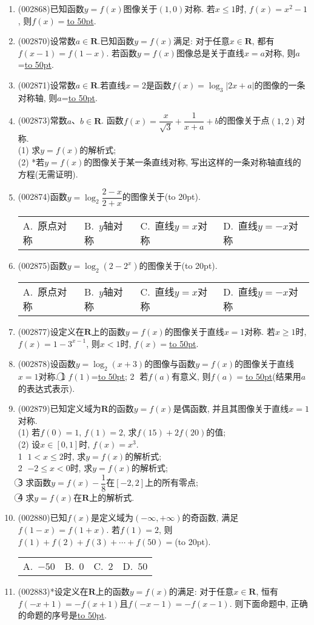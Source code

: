 \documentclass[10pt,a4paper]{article}
\newcommand{\blank}[1]{\underline{\hbox to #1pt{}}}
\newcommand{\bracket}[1]{(\hbox to #1pt{})}
\newcommand{\fourch}[4]{\par\begin{tabular}{p{.23\textwidth}p{.23\textwidth}p{.23\textwidth}p{.23\textwidth}}
A.~#1 &B.~#2& C.~#3& D.~#4
\end{tabular}}
\begin{document}
\begin{enumerate}[1.]
\item {\tiny (002868)}已知函数$y=f(x)$图像关于$(1,0)$对称. 若$x\le 1$时, $f(x)=x^2-1$, 则$f(x)=$\blank{50}.
\item {\tiny (002870)}设常数$a\in \mathbf{R}$.已知函数$y=f(x)$满足: 对于任意$x\in \mathbf{R}$, 都有$f(x-1)=f(1-x)$. 若函数$y=f(x)$图像总是关于直线$x=a$对称, 则$a$=\blank{50}.
\item {\tiny (002871)}设常数$a\in \mathbf{R}$.若直线$x=2$是函数$f(x)=\log_3|2x+a|$的图像的一条对称轴, 则$a$=\blank{50}.
\item {\tiny (002873)}常数$a$、$b\in \mathbf{R}$. 函数$f(x)=\dfrac x{\sqrt 3}+\dfrac 1{x+a}+b$的图像关于点$(1,2)$对称.\\
(1) 求$y=f(x)$的解析式;\\
(2) *若$y=f(x)$的图像关于某一条直线对称, 写出这样的一条对称轴直线的方程(无需证明).
\item {\tiny (002874)}函数$y=\log_2\dfrac{2-x}{2+x}$的图像关于\bracket{20}.
\fourch{原点对称}{$y$轴对称}{直线$y=x$对称}{直线$y=-x$对称}
\item {\tiny (002875)}函数$y=\log_2(2-2^x)$的图像关于\bracket{20}.
\fourch{原点对称}{$y$轴对称}{直线$y=x$对称}{直线$y=-x$对称}
\item {\tiny (002877)}设定义在$\mathbf{R}$上的函数$y=f(x)$的图像关于直线$x=1$对称. 若$x\ge 1$时, $f(x)=1-3^{x-1}$, 则$x<1$时, $f(x)=$\blank{50}.
\item {\tiny (002878)}设函数$y=\log_2(x+3)$的图像与函数$y=f(x)$的图像关于直线$x=1$对称. \textcircled{1} $f(1)$=\blank{50}; \textcircled{2} 若$f(a)$有意义, 则$f(a)=$\blank{50}(结果用$a$的表达式表示).
\item {\tiny (002879)}已知定义域为$\mathbf{R}$的函数$y=f(x)$是偶函数, 并且其图像关于直线$x=1$对称.\\
(1) 若$f(0)=1$, $f(1)=2$, 求$f(15)+2f(20)$的值;\\
(2) 设$x\in [0,1]$时, $f(x)=x^3$.\\
\textcircled{1} $1<x\le 2$时, 求$y=f(x)$的解析式;\\
\textcircled{2} $-2\le x<0$时, 求$y=f(x)$的解析式;\\
\textcircled{3} 求函数$y=f(x)-\dfrac 18$在$[-2,2]$上的所有零点;\\
\textcircled{4} 求$y=f(x)$在$\mathbf{R}$上的解析式.
\item {\tiny (002880)}已知$f(x)$是定义域为$(-\infty,+\infty)$的奇函数, 满足$f(1-x)=f(1+x)$. 若$f(1)=2$, 则$f(1)+f(2)+f(3)+\cdots +f(50)=$\bracket{20}.
\fourch{$-50$}{$0$}{$2$}{$50$}
\item {\tiny (002883)}*设定义在$\mathbf{R}$上的函数$y=f(x)$的满足: 对于任意$x\in \mathbf{R}$, 恒有$f(-x+1)=-f(x+1)$且$f(-x-1)=-f(x-1)$. 则下面命题中, 正确的命题的序号是\blank{50}.\\

\end{enumerate}
\end{document}
